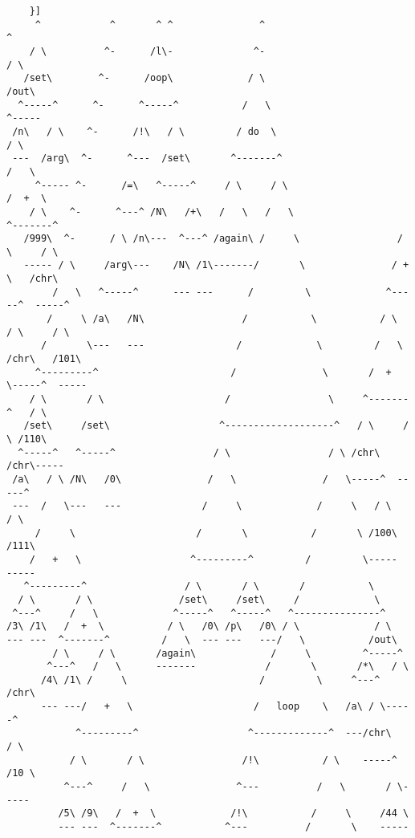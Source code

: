 \documentclass[aip,jcp,reprint,footinbib]{revtex4-1}
\begin{document}
\begin{lstlisting}
    }]
     ^            ^       ^ ^               ^                               ^
    / \          ^-      /l\-              ^-                              / \
   /set\        ^-      /oop\             / \                             /out\
  ^-----^      ^-      ^-----^           /   \                           ^-----
 /n\   / \    ^-      /!\   / \         / do  \                         / \
 ---  /arg\  ^-      ^---  /set\       ^-------^                       /   \
     ^----- ^-      /=\   ^-----^     / \     / \                     /  +  \
    / \    ^-      ^---^ /N\   /+\   /   \   /   \                   ^-------^
   /999\  ^-      / \ /n\---  ^---^ /again\ /     \                 / \     / \
   ----- / \     /arg\---    /N\ /1\-------/       \               / + \   /chr\
        /   \   ^-----^      --- ---      /         \             ^-----^  -----^
       /     \ /a\   /N\                 /           \           / \   / \     / \
      /       \---   ---                /             \         /   \ /chr\   /101\
     ^---------^                       /               \       /  +  \-----^  -----
    / \       / \                     /                 \     ^-------^   / \
   /set\     /set\                   ^-------------------^   / \     / \ /110\
  ^-----^   ^-----^                 / \                 / \ /chr\   /chr\-----
 /a\   / \ /N\   /0\               /   \               /   \-----^  -----^
 ---  /   \---   ---              /     \             /     \   / \     / \
     /     \                     /       \           /       \ /100\   /111\
    /   +   \                   ^---------^         /         \-----   -----
   ^---------^                 / \       / \       /           \
  / \       / \               /set\     /set\     /             \
 ^---^     /   \             ^-----^   ^-----^   ^---------------^
/3\ /1\   /  +  \           / \   /0\ /p\   /0\ / \             / \
--- ---  ^-------^         /   \  --- ---   ---/   \           /out\
        / \     / \       /again\             /     \         ^-----^
       ^---^   /   \      -------            /       \       /*\   / \
      /4\ /1\ /     \                       /         \     ^---^ /chr\
      --- ---/   +   \                     /   loop    \   /a\ / \-----^
            ^---------^                   ^-------------^  ---/chr\   / \
           / \       / \                 /!\           / \    -----^ /10 \
          ^---^     /   \               ^---          /   \       / \-----
         /5\ /9\   /  +  \             /!\           /     \     /44 \
         --- ---  ^-------^           ^---          /       \    -----

\end{lstlisting}
\end{document}
